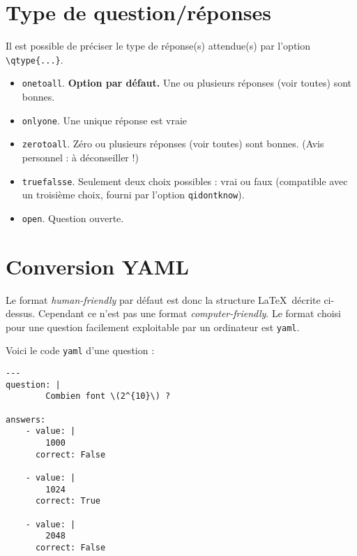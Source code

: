\documentclass[12pt,a4paper]{article}
\begin{document}
\section{Type de question/réponses}

Il est possible de préciser le type de réponse(s) attendue(s) par l'option \verb|\qtype{...}|.

\begin{itemize}
  \item  \verb|onetoall|. \textbf{Option par défaut.} Une ou plusieurs réponses (voir toutes) sont bonnes.
  \item \verb|onlyone|. Une unique réponse est vraie
  \item \verb|zerotoall|. Zéro ou plusieurs réponses (voir toutes) sont bonnes. (Avis personnel : à déconseiller !)
  \item \verb|truefalsse|. Seulement deux choix possibles : vrai ou faux (compatible avec un troisième choix, fourni par l'option \verb|qidontknow|).
  \item \verb|open|. Question ouverte.
\end{itemize}  
  







\section{Conversion YAML}


Le format \emph{human-friendly} par défaut est donc la structure \LaTeX\ décrite ci-dessus. Cependant ce n'est pas une format \emph{computer-friendly}. Le format choisi pour une question facilement exploitable par un ordinateur est \texttt{yaml}.

Voici le code \texttt{yaml} d'une question :
\begin{center}
\begin{minipage}{0.8\textwidth}
\begin{verbatim}
---
question: |
        Combien font \(2^{10}\) ?

answers: 
    - value: |
        1000
      correct: False

    - value: |
        1024
      correct: True

    - value: |
        2048
      correct: False
\end{verbatim}
\end{minipage}
\end{center}
\end{document}
